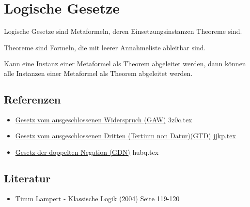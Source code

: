 \documentclass{sajzk}
\begin{document}
\section{Logische Gesetze}
\label{s52i}
Logische Gesetze sind Metaformeln, deren Einsetzungsinstanzen Theoreme sind.

Theoreme sind Formeln, die mit leerer Annahmeliste ableitbar sind.

Kann eine Instanz einer Metaformel als Theorem abgeleitet werden, dann können
alle Instanzen einer Metaformel als Theorem abgeleitet werden.

\subsection{Referenzen}
\begin{itemize}
    \item \href{3z0c.pdf}{Gesetz vom ausgeschlossenen Widerspruch (GAW)} 3z0c.tex
    \item \href{jjkp.pdf}{Gesetz vom ausgeschlossenen Dritten (Tertium non Datur)(GTD)} jjkp.tex
    \item \href{hubq.pdf}{Gesetz der doppelten Negation (GDN)} hubq.tex
\end{itemize}

\subsection{Literatur}
\begin{itemize}
    \item Timm Lampert - Klassische Logik (2004) Seite 119-120
\end{itemize}
\end{document}
